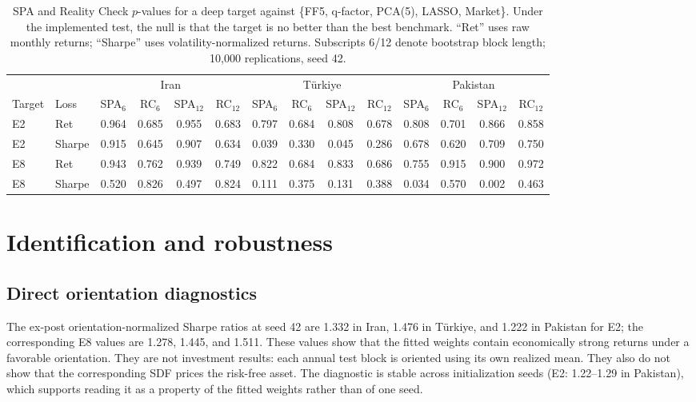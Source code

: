 \documentclass[12pt]{article}
\begin{document}
\begin{table}[htbp]
\centering
\caption{SPA and Reality Check $p$-values for a deep target against \{FF5, q-factor, PCA(5), LASSO, Market\}. Under the implemented test, the null is that the target is no better than the best benchmark. ``Ret'' uses raw monthly returns; ``Sharpe'' uses volatility-normalized returns. Subscripts 6/12 denote bootstrap block length; 10,000 replications, seed 42.}
\label{tab:spa}
\scriptsize
\setlength{\tabcolsep}{3pt}
\begin{tabular}{ll cccc cccc cccc}
\toprule
 & & \multicolumn{4}{c}{Iran} & \multicolumn{4}{c}{T\"urkiye} & \multicolumn{4}{c}{Pakistan} \\
\cmidrule(lr){3-6}\cmidrule(lr){7-10}\cmidrule(lr){11-14}
Target & Loss & SPA$_6$ & RC$_6$ & SPA$_{12}$ & RC$_{12}$ & SPA$_6$ & RC$_6$ & SPA$_{12}$ & RC$_{12}$ & SPA$_6$ & RC$_6$ & SPA$_{12}$ & RC$_{12}$ \\
\midrule
E2 & Ret & 0.964 & 0.685 & 0.955 & 0.683 & 0.797 & 0.684 & 0.808 & 0.678 & 0.808 & 0.701 & 0.866 & 0.858 \\
E2 & Sharpe & 0.915 & 0.645 & 0.907 & 0.634 & 0.039 & 0.330 & 0.045 & 0.286 & 0.678 & 0.620 & 0.709 & 0.750 \\
E8 & Ret & 0.943 & 0.762 & 0.939 & 0.749 & 0.822 & 0.684 & 0.833 & 0.686 & 0.755 & 0.915 & 0.900 & 0.972 \\
E8 & Sharpe & 0.520 & 0.826 & 0.497 & 0.824 & 0.111 & 0.375 & 0.131 & 0.388 & 0.034 & 0.570 & 0.002 & 0.463 \\
\bottomrule
\end{tabular}
\end{table}

\section{Identification and robustness}\label{sec:robust}

\subsection{Direct orientation diagnostics}\label{sec:orientation}

The ex-post orientation-normalized Sharpe ratios at seed 42 are 1.332 in Iran, 1.476 in T\"urkiye, and 1.222 in Pakistan for E2; the corresponding E8 values are 1.278, 1.445, and 1.511. These values show that the fitted weights contain economically strong returns under a favorable orientation. They are not investment results: each annual test block is oriented using its own realized mean. They also do not show that the corresponding SDF prices the risk-free asset. The diagnostic is stable across initialization seeds (E2: 1.22--1.29 in Pakistan), which supports reading it as a property of the fitted weights rather than of one seed.
\end{document}
